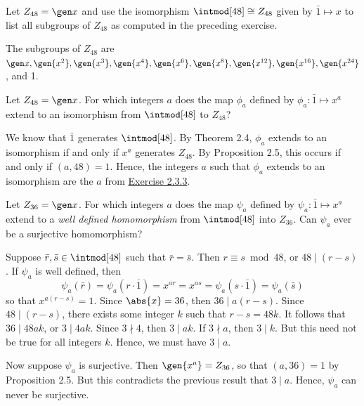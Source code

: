 \begin{exercise}\label{ex2.3.7}
    Let $Z_{48} = \gen x$ and use the isomorphism $\intmod[48] \cong Z_{48}$ given by $\bar 1 \mapsto x$ to list all subgroups of $Z_{48}$ as computed in the preceding exercise.
\end{exercise}

\begin{sol}
    The subgroups of $Z_{48}$ are $\gen x, \gen{x^2}, \gen {x^3}, \gen{x^4}, \gen{x^6}, \gen{x^8}, \gen{x^{12}}, \gen{x^{16}}, \gen{x^{24}}$, and 1.
\end{sol}

\begin{exercise}\label{ex2.3.8}
    Let $Z_{48} = \gen x$. For which integers $a$ does the map $\phi_a$ defined by $\phi_a : \bar 1 \mapsto x^a$ extend to an isomorphism from $\intmod[48]$ to $Z_{48}$?
\end{exercise}

\begin{sol}
    We know that $\bar 1$ generates $\intmod[48]$. By Theorem 2.4, $\phi_a$ extends to an isomorphism if and only if $x^a$ generates $Z_{48}$. By Proposition 2.5, this occurs if and only if $(a, 48) = 1$. Hence, the integers $a$ such that $\phi_a$ extends to an isomorphism are the $a$ from \hyperref[ex2.3.3]{Exercise 2.3.3}.
\end{sol}


\begin{exercise}\label{ex2.3.9}
    Let $Z_{36} = \gen x$. For which integers $a$ does the map $\psi_a$ defined by $\psi_a : \bar 1 \mapsto x^a$ extend to a \emph{well defined homomorphism} from $\intmod[48]$ into $Z_{36}$. Can $\psi_a$ ever be a surjective homomorphism?
\end{exercise}

\begin{sol}
    Suppose $\bar r, \bar s \in \intmod[48]$ such that $\bar r = \bar s$. Then $r \equiv s \bmod 48$, or $48 \mid (r - s)$. If $\psi_a$ is well defined, then
    \[\psi_a(\bar r) = \psi_a(r \cdot \bar 1) = x^{a r} = x^{a s} = \psi_a(s \cdot \bar 1) = \psi_a(\bar s)\]
    so that $x^{a (r - s)} = 1$. Since $\abs{x} = 36$, then $36 \mid a (r - s)$. Since $48 \mid (r - s)$, there exists some integer $k$ such that $r - s = 48 k$. It follows that $36 \mid 48 a k$, or $3 \mid 4 a k$. Since $3 \nmid 4$, then $3 \mid a k$. If $3 \nmid a$, then $3 \mid k$. But this need not be true for all integers $k$. Hence, we must have $3 \mid a$.

    Now suppose $\psi_a$ is surjective. Then $\gen{x^a} = Z_{36}$, so that $(a, 36) = 1$ by Proposition 2.5. But this contradicts the previous result that $3 \mid a$. Hence, $\psi_a$ can never be surjective.
\end{sol}

